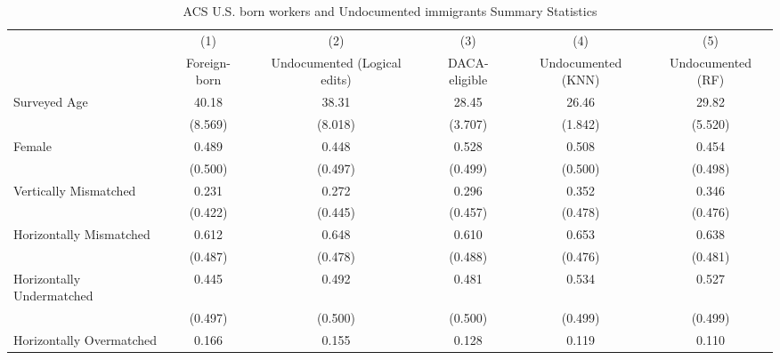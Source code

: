 \begin{table}[htbp]\centering
\def\sym#1{\ifmmode^{#1}\else\(^{#1}\)\fi}
\caption{ACS U.S. born workers and Undocumented immigrants Summary Statistics \label{tab:sum}}
\begin{tabular}{l*{5}{c}}
\hline\hline
                    &\multicolumn{1}{c}{(1)}         &\multicolumn{1}{c}{(2)}         &\multicolumn{1}{c}{(3)}         &\multicolumn{1}{c}{(4)}         &\multicolumn{1}{c}{(5)}         \\
                    &Foreign-born         &Undocumented (Logical edits)         &DACA-eligible         &Undocumented (KNN)         &Undocumented (RF)         \\
\hline
Surveyed Age        &       40.18         &       38.31         &       28.45         &       26.46         &       29.82         \\
                    &     (8.569)         &     (8.018)         &     (3.707)         &     (1.842)         &     (5.520)         \\
[1em]
Female              &       0.489         &       0.448         &       0.528         &       0.508         &       0.454         \\
                    &     (0.500)         &     (0.497)         &     (0.499)         &     (0.500)         &     (0.498)         \\
[1em]
Vertically Mismatched&       0.231         &       0.272         &       0.296         &       0.352         &       0.346         \\
                    &     (0.422)         &     (0.445)         &     (0.457)         &     (0.478)         &     (0.476)         \\
[1em]
Horizontally Mismatched&       0.612         &       0.648         &       0.610         &       0.653         &       0.638         \\
                    &     (0.487)         &     (0.478)         &     (0.488)         &     (0.476)         &     (0.481)         \\
[1em]
Horizontally Undermatched&       0.445         &       0.492         &       0.481         &       0.534         &       0.527         \\
                    &     (0.497)         &     (0.500)         &     (0.500)         &     (0.499)         &     (0.499)         \\
[1em]
Horizontally Overmatched&       0.166         &       0.155         &       0.128         &       0.119         &       0.110         \\

\end{tabular}
\end{table}
